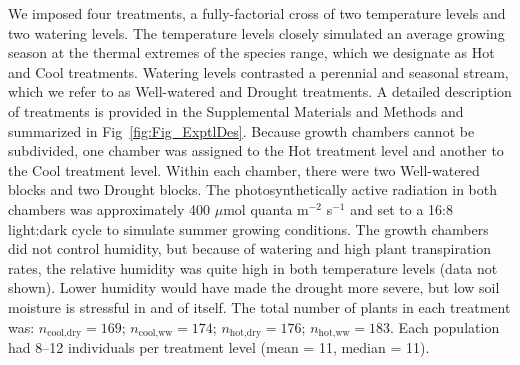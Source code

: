 \documentclass[11pt, oneside]{article}
\begin{document}
We imposed four treatments, a fully-factorial cross of two temperature levels and two watering levels. The temperature levels closely simulated an average growing season at the thermal extremes of the species range, which we designate as Hot and Cool treatments. Watering levels contrasted a perennial and seasonal stream, which we refer to as Well-watered and Drought treatments. A detailed description of treatments is provided in the Supplemental Materials and Methods and summarized in Fig~\ref{fig:Fig_ExptlDes}. Because growth chambers cannot be subdivided, one chamber was assigned to the Hot treatment level and another to the Cool treatment level. Within each chamber, there were two Well-watered blocks and two Drought blocks. The photosynthetically active radiation in both chambers was approximately 400 $\mu$mol quanta m$^{-2}$ s$^{-1}$ and set to a 16:8 light:dark cycle to simulate summer growing conditions. The growth chambers did not control humidity, but because of watering and high plant transpiration rates, the relative humidity was quite high in both temperature levels (data not shown). Lower humidity would have made the drought more severe, but low soil moisture is stressful in and of itself. The total number of plants in each treatment was: $n_{\text{cool,dry}} = 169$; $n_{\text{cool,ww}} = 174$; $n_{\text{hot,dry}} = 176$; $n_{\text{hot,ww}} = 183$. Each population had 8--12 individuals per treatment level (mean = 11, median = 11).


\end{document}
